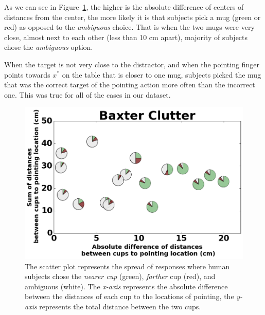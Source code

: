 As we can see in Figure~\ref{fig:cluttered}, the higher is the absolute difference of centers of distances from the center, the more likely it is that subjects pick a mug (green or red) as opposed to the \textit{ambiguous} choice. That is when the two mugs were very close, almost next to each other (less than 10 cm apart), majority of subjects chose the \textit{ambiguous} option. 







When the target is not very close to the distractor, and when the pointing finger points towards $x^*$ on the table that is closer to one mug, subjects picked the mug that was the correct target of the pointing action more often than the incorrect one. This was true for all of the cases in our dataset. 


\begin{figure}[h!]

    \centering
    \includegraphics[width=\linewidth]{figures/baxter_Clutter_granular.png}
    \caption{
    The scatter plot represents the spread of responses where human subjects chose the \textit{nearer cup} (green), \textit{farther} cup (red), and ambiguous (white). 
    The \textit{x-axis} represents the absolute difference between the distances of each cup to the locations of pointing, the \textit{y-axis} represents the total distance between the two cups.
    }
    \label{fig:cluttered}

\end{figure}